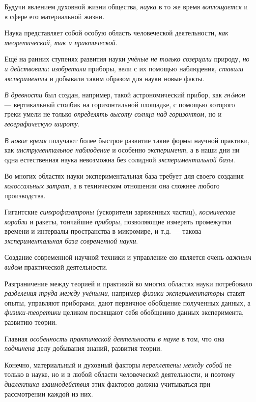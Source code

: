 \documentclass[a4paper,14pt,russian]{extreport}
\begin{document}
Будучи явлением духовной жизни общества, \emph{наука} в то же время \emph{воплощается} и в сфере его материальной жизни.

Наука представляет собой особую область человеческой деятельности, \emph{как теоретической, так и практической.}

Ещё на ранних ступенях развития науки \emph{учёные не только созерцали} природу, \emph{но и действовали}: \emph{изобретали} приборы, вели с их помощью наблюдения, \emph{ставили эксперименты} и добывали таким образом для науки новые факты.

\emph{В древности} был создан, например, такой астрономический прибор, как \emph{гнóмон} --- вертикальный столбик на горизонтальной площадке, с помощью которого греки умели не только \emph{определять высоту солнца над горизонтом}, но и \emph{географическую широту}.

\emph{В новое время} получают более быстрое развитие такие формы научной практики, как \emph{инструментальное наблюдение} и особенно \emph{эксперимент}, а в наши дни ни одна естественная наука невозможна без солидной \emph{экспериментальной базы}.

Во многих областях науки экспериментальная база требует для своего создания \emph{колоссальных затрат}, а в техническом отношении она сложнее любого производства.

Гигантские \emph{синхрофазатроны} (ускорители заряженных частиц), \emph{космические корабли} и ракеты, тончайшие \emph{приборы}, позволяющие измерять промежутки времени и интервалы пространства в микромире, и т.д. --- такова \emph{экспериментальная база современной науки}.

Создание современной научной техники и управление ею является очень \emph{важным видом} практической деятельности.

Разграничение между теорией и практикой во многих областях науки потребовало \emph{разделения труда между учёными}, например \emph{физики-экспериментаторы} ставят опыты, управляют приборами, дают первичное обобщение полученных данных, а \emph{физики-теоретики} целиком посвящают себя обобщению данных эксперимента, развитию теории.

Главная \emph{особенность практической деятельности в науке} в том, что она \emph{подчинена} делу добывания знаний, развития теории.

Конечно, материальный и духовный факторы \emph{переплетены между собой} не только в науке, но и в любой области человеческой деятельности, и поэтому \emph{диалектика взаимодействия} этих факторов должна учитываться при рассмотрении каждой из них.
\end{document}

